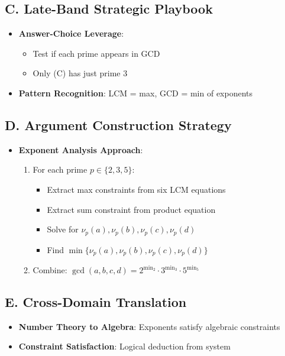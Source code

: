 \documentclass[12pt]{article}
\begin{document}
\begin{strategicbox}
\subsection*{C. Late-Band Strategic Playbook}
\begin{itemize}[leftmargin=*]
    \item \textbf{Answer-Choice Leverage}: 
    \begin{itemize}
        \item Test if each prime appears in GCD
        \item Only (C) has just prime 3
    \end{itemize}
    \item \textbf{Pattern Recognition}: LCM = max, GCD = min of exponents
\end{itemize}

\subsection*{D. Argument Construction Strategy}
\begin{itemize}[leftmargin=*]
    \item \textbf{Exponent Analysis Approach}: 
    \begin{enumerate}
        \item For each prime $p \in \{2, 3, 5\}$:
        \begin{itemize}
            \item Extract max constraints from six LCM equations
            \item Extract sum constraint from product equation
            \item Solve for $\nu_p(a), \nu_p(b), \nu_p(c), \nu_p(d)$
            \item Find $\min\{\nu_p(a), \nu_p(b), \nu_p(c), \nu_p(d)\}$
        \end{itemize}
        \item Combine: $\gcd(a,b,c,d) = 2^{\min_2} \cdot 3^{\min_3} \cdot 5^{\min_5}$
    \end{enumerate}
\end{itemize}

\subsection*{E. Cross-Domain Translation}
\begin{itemize}[leftmargin=*]
    \item \textbf{Number Theory to Algebra}: Exponents satisfy algebraic constraints
    \item \textbf{Constraint Satisfaction}: Logical deduction from system
\end{itemize}
\end{strategicbox}
\end{document}
